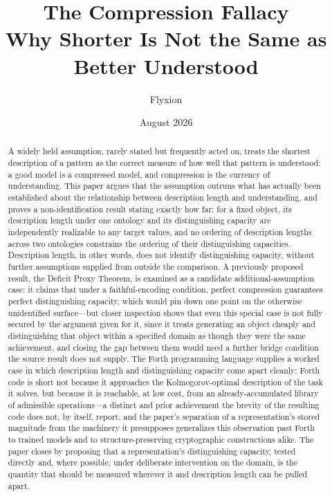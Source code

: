 \documentclass[11pt]{article}
\title{\textbf{The Compression Fallacy}\\[0.3em]
\large Why Shorter Is Not the Same as Better Understood}
\author{Flyxion}
\date{August 2026}
\theoremstyle{plain}
\begin{document}
\maketitle

\begin{abstract}
\noindent
A widely held assumption, rarely stated but frequently acted on, treats the shortest description of a pattern as the correct measure of how well that pattern is understood: a good model is a compressed model, and compression is the currency of understanding. This paper argues that the assumption outruns what has actually been established about the relationship between description length and understanding, and proves a non-identification result stating exactly how far: for a fixed object, its description length under one ontology and its distinguishing capacity are independently realizable to any target values, and no ordering of description lengths across two ontologies constrains the ordering of their distinguishing capacities. Description length, in other words, does not identify distinguishing capacity, without further assumptions supplied from outside the comparison. A previously proposed result, the Deficit Proxy Theorem, is examined as a candidate additional-assumption case: it claims that under a faithful-encoding condition, perfect compression guarantees perfect distinguishing capacity, which would pin down one point on the otherwise unidentified surface---but closer inspection shows that even this special case is not fully secured by the argument given for it, since it treats generating an object cheaply and distinguishing that object within a specified domain as though they were the same achievement, and closing the gap between them would need a further bridge condition the source result does not supply. The Forth programming language supplies a worked case in which description length and distinguishing capacity come apart cleanly: Forth code is short not because it approaches the Kolmogorov-optimal description of the task it solves, but because it is reachable, at low cost, from an already-accumulated library of admissible operations---a distinct and prior achievement the brevity of the resulting code does not, by itself, report, and the paper's separation of a representation's stored magnitude from the machinery it presupposes generalizes this observation past Forth to trained models and to structure-preserving cryptographic constructions alike. The paper closes by proposing that a representation's distinguishing capacity, tested directly and, where possible, under deliberate intervention on the domain, is the quantity that should be measured wherever it and description length can be pulled apart.
\end{abstract}
\end{document}
